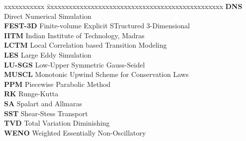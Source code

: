 \abbreviations

\noindent 
\begin{tabbing}
xxxxxxxxxxx \= xxxxxxxxxxxxxxxxxxxxxxxxxxxxxxxxxxxxxxxxxxxxxxxx \kill
\textbf{DNS} \> Direct Numerical Simulation  \\
\textbf{FEST-3D} \> Finite-volume Explicit STructured 3-Dimensional  \\
\textbf{IITM}   \> Indian Institute of Technology, Madras \\
\textbf{LCTM} \> Local Correlation based Transition Modeling  \\
\textbf{LES} \> Large Eddy Simulation  \\
\textbf{LU-SGS} \> Low-Upper Symmetric Gauss-Seidel  \\
\textbf{MUSCL} \> Monotonic Upwind Scheme for Conservation Laws \\
\textbf{PPM} \> Piecewise Parabolic Method  \\
\textbf{RK} \> Runge-Kutta  \\
\textbf{SA} \> Spalart and Allmaras  \\
\textbf{SST} \> Shear-Stess Transport  \\
\textbf{TVD} \> Total Variation Diminishing  \\
\textbf{WENO} \> Weighted Essentially Non-Oscillatory  \\
\end{tabbing}

\pagebreak

